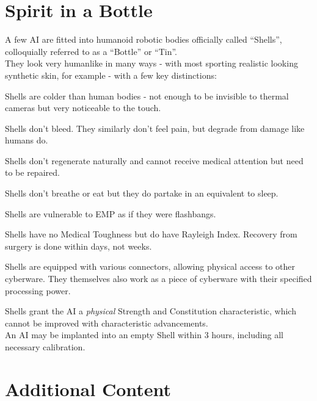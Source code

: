 \documentclass[12pt,a4paper,openany,usenames,dvipsnames]{book}
\begin{document}
	\chapter{Spirit in a Bottle}
	A few AI are fitted into humanoid robotic bodies officially called “Shells”, colloquially referred to as a “Bottle” or “Tin”.
	\\%
	They look very humanlike in many ways - with most sporting realistic looking synthetic skin, for example - with a few key distinctions:
	\begin{sitemize}[8]
		\item Shells are colder than human bodies - not enough to be invisible to thermal cameras but very noticeable to the touch.
		\item Shells don’t bleed.
			They similarly don't feel pain,
				but degrade from damage like humans do.
		\item Shells don’t regenerate naturally and cannot receive medical attention but need to be repaired.
		\item Shells don’t breathe or eat but they do partake in an equivalent to sleep.
		\item Shells are vulnerable to EMP as if they were flashbangs.
		\item Shells have no Medical Toughness but do have Rayleigh Index. Recovery from surgery is done within days, not weeks.
		\item Shells are equipped with various connectors, allowing physical access to other cyberware. They themselves also work as a piece of cyberware with their specified processing power.
	\end{sitemize}
	\par
	Shells grant the AI a \emph{physical} Strength and Constitution characteristic, which cannot be improved with characteristic advancements.
	\\%
	An AI may be implanted into an empty Shell within 3 hours, including all necessary calibration.

	\chapter{Additional Content}
	\vspace{-18mm}
\end{document}
